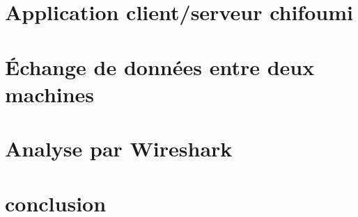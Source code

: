 \documentclass[10pt,a4paper,final]{article}
\begin{document}
\section{Application client/serveur chifoumi}


\section{Échange de données entre deux machines}


\section{Analyse par Wireshark}


\section{conclusion}
\end{document}
